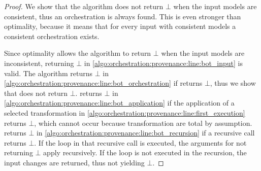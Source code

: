\begin{proof}
    We show that the algorithm does not return $\bot$ when the input models are consistent, thus an orchestration is always found.
    This is even stronger than optimality, because it means that for every input with consistent models a consistent orchestration exists.

    Since optimality allows the algorithm to return $\bot$ when the input models are inconsistent, returning $\bot$ in \autoref{algo:orchestration:provenance:line:bot_input} is valid.
    The algorithm returns $\bot$ in \autoref{algo:orchestration:provenance:line:bot_orchestration} if  returns $\bot$, thus we show that  does not return $\bot$.
     returns $\bot$ in \autoref{algo:orchestration:provenance:line:bot_application} if the application of a selected transformation in \autoref{algo:orchestration:provenance:line:first_execution} returns $\bot$, which cannot occur because transformation are total by assumption.
     returns $\bot$ in \autoref{algo:orchestration:provenance:line:bot_recursion} if a recursive call returns $\bot$. If the loop in that recursive call is executed, the arguments for not returning $\bot$ apply recursively. If the loop is not executed in the recursion, the input changes are returned, thus not yielding $\bot$.
    

\end{proof}

